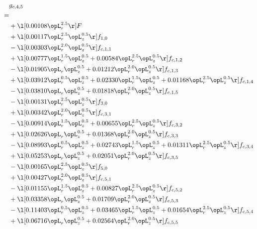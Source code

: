 \begin{alignat}{2} 
\label{eq:g_45_0} 
& g_{c,4,5} \nonumber \\ 
 = \\ 
& + \l[  0.00108 \opL_r^{2.5}  \r] F \nonumber \\ 
& + \l[  0.00117 \opL_r^{2.5} \opL_z^{0.5}  \r] f_{1,0} \nonumber \\ 
& - \l[  0.00303 \opL_r^{2.0} \opL_z^{0.5}  \r] f_{c,1,1} \nonumber \\ 
& + \l[  0.00777 \opL_r^{1.5} \opL_z^{0.5} +  0.00584 \opL_r^{2.5} \opL_z^{0.5}  \r] f_{c,1,2} \nonumber \\ 
& - \l[  0.01905 \opL_r \opL_z^{0.5} +  0.01212 \opL_r^{2.0} \opL_z^{0.5}  \r] f_{c,1,3} \nonumber \\ 
& + \l[  0.03912 \opL_r^{0.5} \opL_z^{0.5} +  0.02330 \opL_r^{1.5} \opL_z^{0.5} +  0.01168 \opL_r^{2.5} \opL_z^{0.5}  \r] f_{c,1,4} \nonumber \\ 
& - \l[  0.03810 \opL_r \opL_z^{0.5} +  0.01818 \opL_r^{2.0} \opL_z^{0.5}  \r] f_{c,1,5} \nonumber \\ 
& - \l[  0.00131 \opL_r^{2.5} \opL_z^{0.5}  \r] f_{3,0} \nonumber \\ 
& + \l[  0.00342 \opL_r^{2.0} \opL_z^{0.5}  \r] f_{c,3,1} \nonumber \\ 
& - \l[  0.00914 \opL_r^{1.5} \opL_z^{0.5} +  0.00655 \opL_r^{2.5} \opL_z^{0.5}  \r] f_{c,3,2} \nonumber \\ 
& + \l[  0.02626 \opL_r \opL_z^{0.5} +  0.01368 \opL_r^{2.0} \opL_z^{0.5}  \r] f_{c,3,3} \nonumber \\ 
& - \l[  0.08993 \opL_r^{0.5} \opL_z^{0.5} +  0.02743 \opL_r^{1.5} \opL_z^{0.5} +  0.01311 \opL_r^{2.5} \opL_z^{0.5}  \r] f_{c,3,4} \nonumber \\ 
& + \l[  0.05253 \opL_r \opL_z^{0.5} +  0.02051 \opL_r^{2.0} \opL_z^{0.5}  \r] f_{c,3,5} \nonumber \\ 
& - \l[  0.00165 \opL_r^{2.5} \opL_z^{0.5}  \r] f_{5,0} \nonumber \\ 
& + \l[  0.00427 \opL_r^{2.0} \opL_z^{0.5}  \r] f_{c,5,1} \nonumber \\ 
& - \l[  0.01155 \opL_r^{1.5} \opL_z^{0.5} +  0.00827 \opL_r^{2.5} \opL_z^{0.5}  \r] f_{c,5,2} \nonumber \\ 
& + \l[  0.03358 \opL_r \opL_z^{0.5} +  0.01709 \opL_r^{2.0} \opL_z^{0.5}  \r] f_{c,5,3} \nonumber \\ 
& - \l[  0.11403 \opL_r^{0.5} \opL_z^{0.5} +  0.03465 \opL_r^{1.5} \opL_z^{0.5} +  0.01654 \opL_r^{2.5} \opL_z^{0.5}  \r] f_{c,5,4} \nonumber \\ 
& + \l[  0.06716 \opL_r \opL_z^{0.5} +  0.02564 \opL_r^{2.0} \opL_z^{0.5}  \r] f_{c,5,5} \nonumber \\ 
\end{alignat} 


